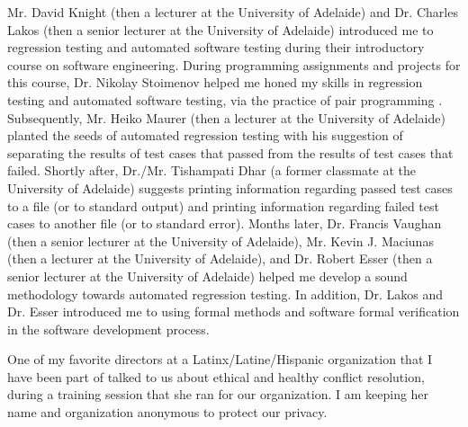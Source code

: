 \documentclass[letter,12pt]{article}
\begin{document}
Mr. David Knight (then a lecturer at the University of Adelaide) and Dr. Charles Lakos (then a senior lecturer at the University of Adelaide) introduced me to regression testing and automated software testing during their introductory course on software engineering. During programming assignments and projects for this course, Dr. Nikolay Stoimenov helped me honed my skills in regression testing and automated software testing, via the practice of pair programming \cite{DeOrio2016,Fox2013,Oram2011,Jalote2008,Shore2008,Wiegers2002}. Subsequently, Mr. Heiko Maurer (then a lecturer at the University of Adelaide) planted the seeds of automated regression testing with his suggestion of separating the results of test cases that passed from the results of test cases that failed. Shortly after, Dr./Mr. Tishampati Dhar (a former classmate at the University of Adelaide) suggests printing information regarding passed test cases to a file (or to standard output) and printing information regarding failed test cases to another file (or to standard error). Months later, Dr. Francis Vaughan (then a senior lecturer at the University of Adelaide), Mr. Kevin J. Maciunas (then a lecturer at the University of Adelaide), and Dr. Robert Esser (then a senior lecturer at the University of Adelaide) helped me develop a sound methodology towards automated regression testing. In addition, Dr. Lakos and Dr. Esser introduced me to using formal methods and software formal verification in the software development process.

One of my favorite directors at a Latinx/Latine/Hispanic organization that I have been part of talked to us about ethical and healthy conflict resolution, during a training session that she ran for our organization. I am keeping her name and organization anonymous to protect our privacy.
\end{document}
